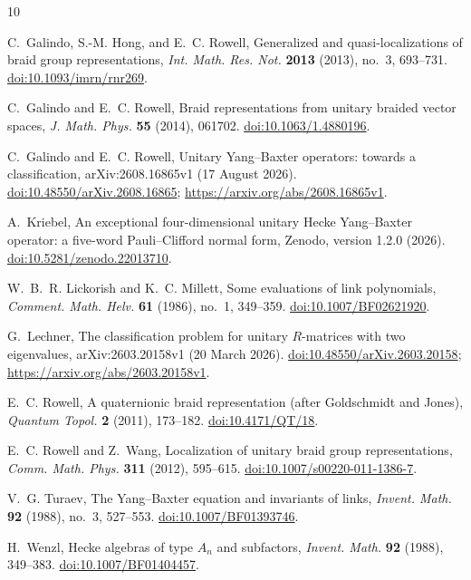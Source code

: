 \documentclass[11pt]{article}
\theoremstyle{remark}
\begin{document}
\begin{thebibliography}{10}

C.~Galindo, S.-M. Hong, and E.~C. Rowell,
\newblock Generalized and quasi-localizations of braid group representations,
\newblock \emph{Int. Math. Res. Not.} \textbf{2013} (2013), no.~3, 693--731.
\newblock \href{https://doi.org/10.1093/imrn/rnr269}{doi:10.1093/imrn/rnr269}.

C.~Galindo and E.~C. Rowell,
\newblock Braid representations from unitary braided vector spaces,
\newblock \emph{J. Math. Phys.} \textbf{55} (2014), 061702.
\newblock \href{https://doi.org/10.1063/1.4880196}{doi:10.1063/1.4880196}.

C.~Galindo and E.~C. Rowell,
\newblock Unitary Yang--Baxter operators: towards a classification,
\newblock arXiv:2608.16865v1 (17 August 2026).
\newblock \href{https://doi.org/10.48550/arXiv.2608.16865}
{doi:10.48550/arXiv.2608.16865};
\url{https://arxiv.org/abs/2608.16865v1}.

A.~Kriebel,
\newblock An exceptional four-dimensional unitary Hecke Yang--Baxter operator:
a five-word Pauli--Clifford normal form,
\newblock Zenodo, version 1.2.0 (2026).
\newblock \href{https://doi.org/10.5281/zenodo.22013710}
{doi:10.5281/zenodo.22013710}.

W.~B.~R. Lickorish and K.~C. Millett,
\newblock Some evaluations of link polynomials,
\newblock \emph{Comment. Math. Helv.} \textbf{61} (1986), no.~1, 349--359.
\newblock \href{https://doi.org/10.1007/BF02621920}
{doi:10.1007/BF02621920}.

G.~Lechner,
\newblock The classification problem for unitary \(R\)-matrices with two
eigenvalues,
\newblock arXiv:2603.20158v1 (20 March 2026).
\newblock \href{https://doi.org/10.48550/arXiv.2603.20158}
{doi:10.48550/arXiv.2603.20158};
\url{https://arxiv.org/abs/2603.20158v1}.

E.~C. Rowell,
\newblock A quaternionic braid representation (after Goldschmidt and Jones),
\newblock \emph{Quantum Topol.} \textbf{2} (2011), 173--182.
\newblock \href{https://doi.org/10.4171/QT/18}{doi:10.4171/QT/18}.

E.~C. Rowell and Z.~Wang,
\newblock Localization of unitary braid group representations,
\newblock \emph{Comm. Math. Phys.} \textbf{311} (2012), 595--615.
\newblock \href{https://doi.org/10.1007/s00220-011-1386-7}
{doi:10.1007/s00220-011-1386-7}.

V.~G. Turaev,
\newblock The Yang--Baxter equation and invariants of links,
\newblock \emph{Invent. Math.} \textbf{92} (1988), no.~3, 527--553.
\newblock \href{https://doi.org/10.1007/BF01393746}
{doi:10.1007/BF01393746}.

H.~Wenzl,
\newblock Hecke algebras of type \(A_n\) and subfactors,
\newblock \emph{Invent. Math.} \textbf{92} (1988), 349--383.
\newblock \href{https://doi.org/10.1007/BF01404457}
{doi:10.1007/BF01404457}.

\end{thebibliography}
\end{document}
